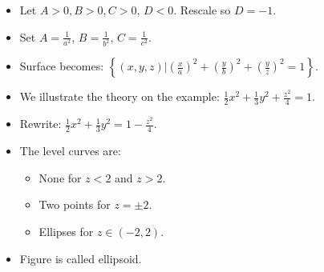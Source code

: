 \begin{frame}
\begin{columns}
\begin{itemize}
\item Let $A>0, B>0, C>0$, $D<0$. Rescale so $D=-1$.
\item<2-> Set $A=\frac{1}{a^2}$, $B=\frac{1}{b^2}$, $C=\frac{1}{c^2}$.
\item<3-> Surface becomes:
$\left\{(x,y,z)|\left(\frac{x}{a}\right)^2+\left(\frac{y}{b}\right)^2+\left(\frac{y}{z}\right)^2= 1\right\}$.
\item<4-> We illustrate the theory on the example:
$\frac{1}{2}x^2+\frac{1}{3}y^2+\frac{z^2}{4}=1$.
\item<5-> Rewrite:
$\frac{1}{2}x^2+\frac{1}{3}y^2=1-\frac{z^2}{4}$.
\item<5-> The level curves are:
\begin{itemize}
\item<7-> None for $z<2$ and $z>2$.
\item<9-> Two points for $z=\pm 2$.
\item<11-> Ellipses for $z\in (-2,2)$. 
\end{itemize}
\item<18> Figure is called ellipsoid.
\end{itemize}

\end{columns}

\vskip 10cm

\end{frame}